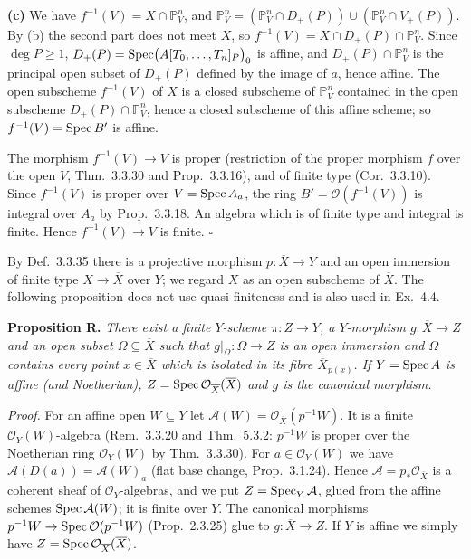 \documentclass[11pt]{article}
\begin{document}
\textbf{(c)} We have $f^{-1}(V)=X\cap\mathbb P^n_V$, and $\mathbb P^n_V=(\mathbb P^n_V\cap D_+(P))\cup(\mathbb P^n_V\cap V_+(P))$. By (b) the second part does not meet $X$, so $f^{-1}(V)=X\cap D_+(P)\cap\mathbb P^n_V$. Since $\deg P\ge1$, $D_+(P)=\operatorname{Spec}\bigl(A[T_0,\dots,T_n]_P\bigr)_0$ is affine, and $D_+(P)\cap\mathbb P^n_V$ is the principal open subset of $D_+(P)$ defined by the image of $a$, hence affine. The open subscheme $f^{-1}(V)$ of $X$ is a closed subscheme of $\mathbb P^n_V$ contained in the open subscheme $D_+(P)\cap\mathbb P^n_V$, hence a closed subscheme of this affine scheme; so $f^{-1}(V)=\operatorname{Spec} B'$ is affine.

The morphism $f^{-1}(V)\to V$ is proper (restriction of the proper morphism $f$ over the open $V$, Thm.~3.3.30 and Prop.~3.3.16), and of finite type (Cor.~3.3.10). Since $f^{-1}(V)$ is proper over $V=\operatorname{Spec} A_a$, the ring $B'=\mathcal O(f^{-1}(V))$ is integral over $A_a$ by Prop.~3.3.18. An algebra which is of finite type and integral is finite. Hence $f^{-1}(V)\to V$ is finite. \hfill$\square$

\pf
By Def.~3.3.35 there is a projective morphism $p:\overline X\to Y$ and an open immersion of finite type $X\to\overline X$ over $Y$; we regard $X$ as an open subscheme of $\overline X$. The following proposition does not use quasi-finiteness and is also used in Ex.~4.4.

\textbf{Proposition R.} \emph{There exist a finite $Y$-scheme $\pi:Z\to Y$, a $Y$-morphism $g:\overline X\to Z$ and an open subset $\Omega\subseteq\overline X$ such that $g|_\Omega:\Omega\to Z$ is an open immersion and $\Omega$ contains every point $x\in\overline X$ which is isolated in its fibre $\overline X_{p(x)}$. If $Y=\operatorname{Spec} A$ is affine (and Noetherian), $Z=\operatorname{Spec}\mathcal O_{\overline X}(\overline X)$ and $g$ is the canonical morphism.}

\emph{Proof.} For an affine open $W\subseteq Y$ let $\mathcal A(W)=\mathcal O_{\overline X}(p^{-1}W)$. It is a finite $\mathcal O_Y(W)$-algebra (Rem.~3.3.20 and Thm.~5.3.2: $p^{-1}W$ is proper over the Noetherian ring $\mathcal O_Y(W)$ by Thm.~3.3.30). For $a\in\mathcal O_Y(W)$ we have $\mathcal A(D(a))=\mathcal A(W)_a$ (flat base change, Prop.~3.1.24). Hence $\mathcal A=p_*\mathcal O_{\overline X}$ is a coherent sheaf of $\mathcal O_Y$-algebras, and we put $Z=\operatorname{Spec}_Y\mathcal A$, glued from the affine schemes $\operatorname{Spec}\mathcal A(W)$; it is finite over $Y$. The canonical morphisms $p^{-1}W\to\operatorname{Spec}\mathcal O(p^{-1}W)$ (Prop.~2.3.25) glue to $g:\overline X\to Z$. If $Y$ is affine we simply have $Z=\operatorname{Spec}\mathcal O_{\overline X}(\overline X)$.
\end{document}
